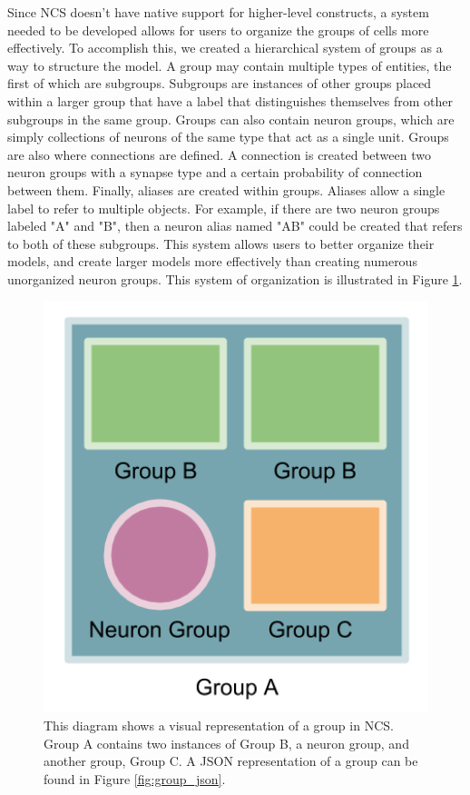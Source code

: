 Since NCS doesn't have native support for higher-level constructs, a system needed to be developed allows for users to organize the groups of cells more effectively. To accomplish this, we created a hierarchical system of groups as a way to structure the model. A group may contain multiple types of entities, the first of which are subgroups. Subgroups are instances of other groups placed within a larger group that have a label that distinguishes themselves from other subgroups in the same group. Groups can also contain neuron groups, which are simply collections of neurons of the same type that act as a single unit. Groups are also where connections are defined. A connection is created between two neuron groups with a synapse type and a certain probability of connection between them. Finally, aliases are created within groups. Aliases allow a single label to refer to multiple objects. For example, if there are two neuron groups labeled "A" and "B", then a neuron alias named "AB" could be created that refers to both of these subgroups. This system allows users to better organize their models, and create larger models more effectively than creating numerous unorganized neuron groups. This system of organization is illustrated in Figure \ref{fig:group_diagram}.

\begin{figure}
\begin{center}
\includegraphics[height=\textheight,width=5in,keepaspectratio]{figures/group_diagram.png}
\caption[Group Hierarchy Diagram]{This diagram shows a visual representation of a group in NCS. Group A contains two instances of Group B, a neuron group, and another group, Group C. A JSON representation of a group can be found in Figure \ref{fig:group_json}.\label{fig:group_diagram}}
\end{center}
\end{figure}

